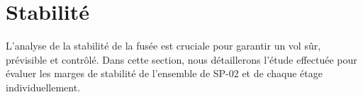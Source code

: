 \section{Stabilité}
\label{sec:stabilite}

L'analyse de la stabilité de la fusée est cruciale pour garantir un vol sûr, prévisible et contrôlé. Dans cette section, nous détaillerons
l'étude effectuée pour évaluer les marges de stabilité de l'ensemble de SP-02 et de chaque étage individuellement.




\newpage